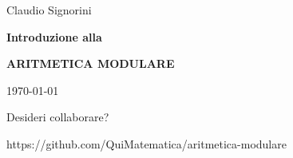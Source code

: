 \begin{titlepage}
    \begin{center}
        \vspace*{1cm}
        
        \LARGE
        Claudio Signorini

        \vspace{1.5cm}

        \Huge
        \textbf{Introduzione alla}

        \textbf{ARITMETICA MODULARE}

        \vspace{1.5cm}

        \LARGE
        \today

        \vfill

        \normalsize
        Desideri collaborare?

        https://github.com/QuiMatematica/aritmetica-modulare
    \end{center}
\end{titlepage}